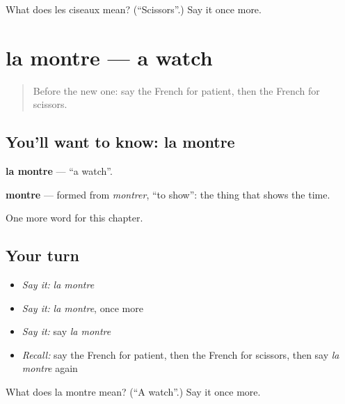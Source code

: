 \begin{tcolorbox}[breakable,colback=teal!4,colframe=teal!35!black,title={Before you move on}]
What does les ciseaux mean? (\textquotedblleft{}Scissors\textquotedblright{}.) Say it once more.
\end{tcolorbox}
\section[la montre]{la montre — a watch}

\label{lesson:FR-C221-montre}



\begin{quote}
Before the new one: say the French for patient, then the French for scissors.
\end{quote}

\subsection*{You'll want to know: la montre}
\textbf{la montre} — \textquotedblleft{}a watch\textquotedblright{}.

\begin{cousinweb}
\textbf{montre} — formed from \emph{montrer}, \textquotedblleft{}to show\textquotedblright{}: the thing that shows the time.
\end{cousinweb}

\begin{grammarlens}[title={What you've built}]
One more word for this chapter.
\end{grammarlens}

\subsection*{Your turn}
\begin{itemize}
\raggedright
  \item \emph{Say it:} \emph{la montre}
  \item \emph{Say it:} \emph{la montre}, once more
  \item \emph{Say it:} say \emph{la montre}
  \item \emph{Recall:} say the French for patient, then the French for scissors, then say \emph{la montre} again
\end{itemize}

\begin{tcolorbox}[breakable,colback=teal!4,colframe=teal!35!black,title={Before you move on}]
What does la montre mean? (\textquotedblleft{}A watch\textquotedblright{}.) Say it once more.
\end{tcolorbox}

